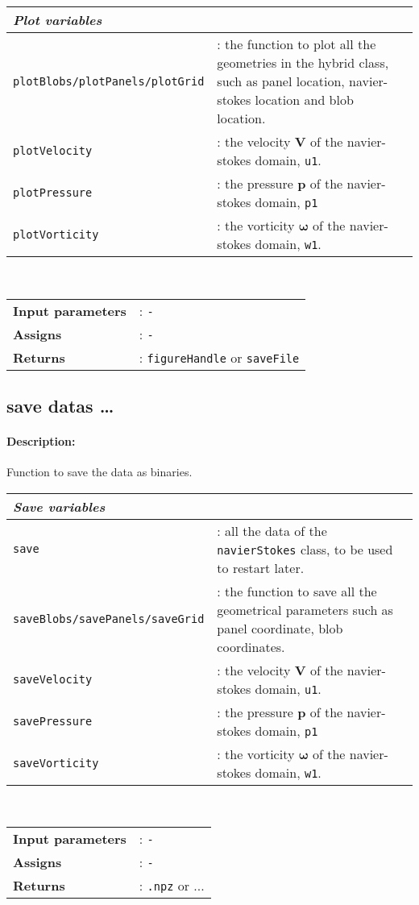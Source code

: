 		\begin{tabular}{lp{10cm}}
			\textit{Plot variables} & \\ \hline
			\texttt{plotBlobs/plotPanels/plotGrid} &: the function to plot all the geometries in the hybrid class, such as panel location, navier-stokes location and blob location.\\
			\texttt{plotVelocity} &: the velocity $\mathbf{V}$ of the navier-stokes domain, \texttt{u1}.\\ 
			\texttt{plotPressure} &: the pressure $\mathbf{p}$ of the navier-stokes domain, \texttt{p1}\\ 
			\texttt{plotVorticity} &: the vorticity $\mathbf{\omega}$ of the navier-stokes domain, \texttt{w1}.\\ 
		\end{tabular} \vspace{5 mm}
	\\
	\begin{tabular}{lp{10cm}}
		\textbf{Input parameters} &: \texttt{-}\\ 
		\textbf{Assigns} &: \texttt{-}\\ 			
		\textbf{Returns} &: \texttt{figureHandle} or \texttt{saveFile}\\ 					
	\end{tabular}

\subsection{save datas \ldots}
	\paragraph{Description:} Function to save the data as binaries.\\
	
		\begin{tabular}{lp{10cm}}
			\textit{Save variables} & \\ \hline
			\texttt{save} & : all the data of the \texttt{navierStokes} class, to be used to restart later.\\
			\texttt{saveBlobs/savePanels/saveGrid} &: the function to save all the geometrical parameters such as panel coordinate, blob coordinates.\\
			\texttt{saveVelocity} &: the velocity $\mathbf{V}$ of the navier-stokes domain, \texttt{u1}.\\ 
			\texttt{savePressure} &: the pressure $\mathbf{p}$ of the navier-stokes domain, \texttt{p1}\\ 
			\texttt{saveVorticity} &: the vorticity $\mathbf{\omega}$ of the navier-stokes domain, \texttt{w1}.\\ 
		\end{tabular} \vspace{5 mm}
	\\
	\begin{tabular}{lp{10cm}}
		\textbf{Input parameters} &: \texttt{-}\\ 
		\textbf{Assigns} &: \texttt{-}\\ 			
		\textbf{Returns} &: \texttt{.npz} or ...\\ 					
	\end{tabular}

